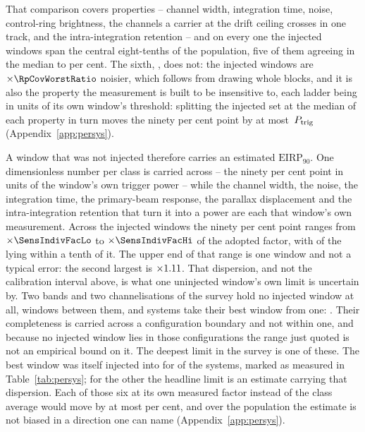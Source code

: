 That comparison covers \RpNAxis{} properties -- channel width, integration
time, noise, control-ring brightness, the channels a carrier at the drift
ceiling crosses in one track, and the intra-integration retention -- and on
every one the injected windows span the central eight-tenths of the
population, five of them agreeing in the median to \RpCovOtherPct{} per cent.
The sixth, \RpCovWorstAxis, does not: the injected windows are
$\times\RpCovWorstRatio$ noisier, which follows from drawing whole blocks,
and it is also the property the measurement is built to be insensitive to,
each ladder being in units of its own window's threshold: splitting the
injected set at the median of each property in turn moves the ninety per cent
point by at most \RpFacShiftMax\,$P_{\rm trig}$ (Appendix~\ref{app:persys}).

A window that was not injected therefore carries an estimated
$\mathrm{EIRP}_{90}$. One dimensionless number per class is
carried across -- the ninety per cent point in units of the window's own trigger power
-- while the channel width, the noise, the integration time, the primary-beam
response, the parallax displacement and the intra-integration retention that
turn it into a power are each that window's own measurement.
Across the injected windows the ninety per cent point
ranges from $\times\SensIndivFacLo$ to $\times\SensIndivFacHi$ of the
adopted factor, with \NmDispNTenth{} of the \SensNInj{} lying within a tenth
of it. The upper end of that range is one window and not a typical error: the
second largest is $\times1.11$. That dispersion, and not the calibration
interval above, is what one uninjected window's own limit is uncertain by.
Two bands and two channelisations of the survey hold no injected window at
all, \NgNExtrapWin{} windows between them, and \NgNExtrapSys{} systems take
their best window from one: \NgExtrapSys. Their completeness is carried
across a configuration boundary and not within one, and because no
injected window lies in those configurations the range just quoted is not an
empirical bound on it. The deepest limit in the survey is one of these.
The best window was itself injected into for \SmcNMeasSys{} of the
\NSysClassA{} systems, marked as measured in Table~\ref{tab:persys}; for the
other \SmcNEstSys{} the headline limit is an estimate carrying that
dispersion. Each of those six at its own measured
factor instead of the class average would move by at most \NmOwnDevPct{} per
cent, and over the population the estimate is not biased in a direction one
can name (Appendix~\ref{app:persys}).

